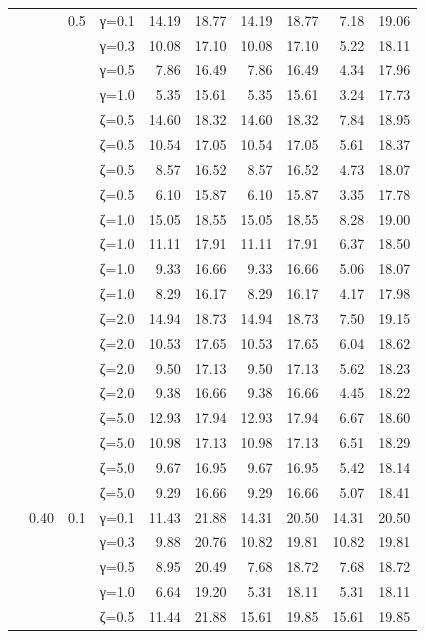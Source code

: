 \begin{table}[htbp]
\begin{tabular}{ll r l  rr  rr  rr}
  &  & 0.5 & γ=0.1 & 14.19 & 18.77 & 14.19 & 18.77 & 7.18 & 19.06 \\
  &  &  & γ=0.3 & 10.08 & 17.10 & 10.08 & 17.10 & 5.22 & 18.11 \\
  &  &  & γ=0.5 & 7.86 & 16.49 & 7.86 & 16.49 & 4.34 & 17.96 \\
  &  &  & γ=1.0 & 5.35 & 15.61 & 5.35 & 15.61 & 3.24 & 17.73 \\
  &  &  & ζ=0.5 & 14.60 & 18.32 & 14.60 & 18.32 & 7.84 & 18.95 \\
  &  &  & ζ=0.5 & 10.54 & 17.05 & 10.54 & 17.05 & 5.61 & 18.37 \\
  &  &  & ζ=0.5 & 8.57 & 16.52 & 8.57 & 16.52 & 4.73 & 18.07 \\
  &  &  & ζ=0.5 & 6.10 & 15.87 & 6.10 & 15.87 & 3.35 & 17.78 \\
  &  &  & ζ=1.0 & 15.05 & 18.55 & 15.05 & 18.55 & 8.28 & 19.00 \\
  &  &  & ζ=1.0 & 11.11 & 17.91 & 11.11 & 17.91 & 6.37 & 18.50 \\
  &  &  & ζ=1.0 & 9.33 & 16.66 & 9.33 & 16.66 & 5.06 & 18.07 \\
  &  &  & ζ=1.0 & 8.29 & 16.17 & 8.29 & 16.17 & 4.17 & 17.98 \\
  &  &  & ζ=2.0 & 14.94 & 18.73 & 14.94 & 18.73 & 7.50 & 19.15 \\
  &  &  & ζ=2.0 & 10.53 & 17.65 & 10.53 & 17.65 & 6.04 & 18.62 \\
  &  &  & ζ=2.0 & 9.50 & 17.13 & 9.50 & 17.13 & 5.62 & 18.23 \\
  &  &  & ζ=2.0 & 9.38 & 16.66 & 9.38 & 16.66 & 4.45 & 18.22 \\
  &  &  & ζ=5.0 & 12.93 & 17.94 & 12.93 & 17.94 & 6.67 & 18.60 \\
  &  &  & ζ=5.0 & 10.98 & 17.13 & 10.98 & 17.13 & 6.51 & 18.29 \\
  &  &  & ζ=5.0 & 9.67 & 16.95 & 9.67 & 16.95 & 5.42 & 18.14 \\
  &  &  & ζ=5.0 & 9.29 & 16.66 & 9.29 & 16.66 & 5.07 & 18.41 \\
  & 0.40 & 0.1 & γ=0.1 & 11.43 & 21.88 & 14.31 & 20.50 & 14.31 & 20.50 \\
  &  &  & γ=0.3 & 9.88 & 20.76 & 10.82 & 19.81 & 10.82 & 19.81 \\
  &  &  & γ=0.5 & 8.95 & 20.49 & 7.68 & 18.72 & 7.68 & 18.72 \\
  &  &  & γ=1.0 & 6.64 & 19.20 & 5.31 & 18.11 & 5.31 & 18.11 \\
  &  &  & ζ=0.5 & 11.44 & 21.88 & 15.61 & 19.85 & 15.61 & 19.85 \\

\end{tabular}
\end{table}
